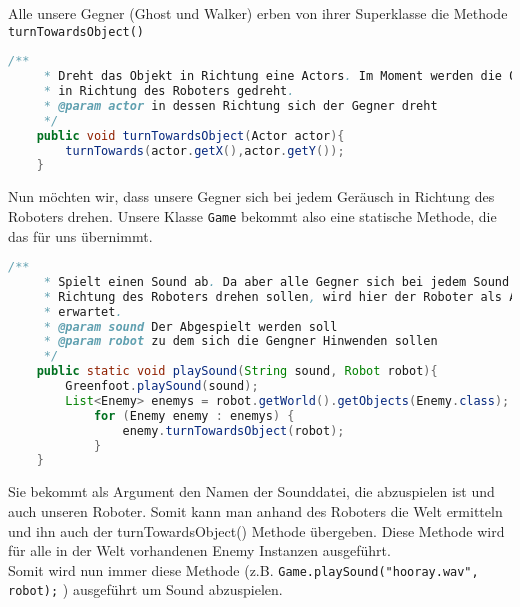 \documentclass{pi1}
\begin{document}
Alle unsere Gegner (Ghost und Walker) erben von ihrer Superklasse die Methode \texttt{turnTowardsObject()}

\begin{lstlisting}[caption={Methode \emph{turnTowardsObject()}}, firstnumber=31, language=Java]
/**
     * Dreht das Objekt in Richtung eine Actors. Im Moment werden die Objekte
     * in Richtung des Roboters gedreht.
     * @param actor in dessen Richtung sich der Gegner dreht
     */
    public void turnTowardsObject(Actor actor){
        turnTowards(actor.getX(),actor.getY());
    }
\end{lstlisting}

Nun möchten wir, dass unsere Gegner sich bei jedem Geräusch in Richtung des Roboters drehen. Unsere Klasse \texttt{Game} bekommt also eine statische Methode, die das für uns übernimmt.

\begin{lstlisting}[caption={Methode \emph{playSound()} in der Klasse Game}, firstnumber=43, language=Java]
/**
     * Spielt einen Sound ab. Da aber alle Gegner sich bei jedem Sound in
     * Richtung des Roboters drehen sollen, wird hier der Roboter als Argument
     * erwartet.
     * @param sound Der Abgespielt werden soll
     * @param robot zu dem sich die Gengner Hinwenden sollen
     */
    public static void playSound(String sound, Robot robot){
        Greenfoot.playSound(sound);
        List<Enemy> enemys = robot.getWorld().getObjects(Enemy.class);
            for (Enemy enemy : enemys) {
                enemy.turnTowardsObject(robot);
            }
    }
\end{lstlisting}

Sie bekommt als Argument den Namen der Sounddatei, die abzuspielen ist und auch unseren Roboter. Somit kann man anhand des Roboters die Welt ermitteln und ihn auch der turnTowardsObject() Methode übergeben. Diese Methode wird für alle in der Welt vorhandenen Enemy Instanzen ausgeführt.\\
Somit wird nun immer diese Methode (z.B. \texttt{Game.playSound("hooray.wav", robot);} ) ausgeführt um Sound abzuspielen.
\end{document}
